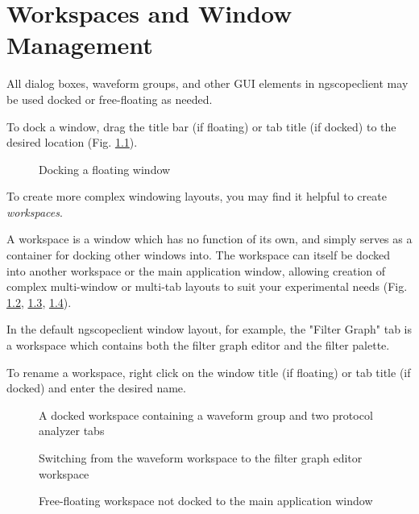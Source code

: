 \chapter{Workspaces and Window Management}

All dialog boxes, waveform groups, and other GUI elements in ngscopeclient may be used docked or free-floating as
needed.

To dock a window, drag the title bar (if floating) or tab title (if docked) to the desired location (Fig.
\ref{w-docking}).

\begin{figure}[h]
\centering
{}
\caption{Docking a floating window}
\label{w-docking}
\end{figure}

To create more complex windowing layouts, you may find it helpful to create \emph{workspaces}.

A workspace is a window which has no function of its own, and simply serves as a container for docking other windows
into. The workspace can itself be docked into another workspace or the main application window, allowing creation of
complex multi-window or multi-tab layouts to suit your experimental needs (Fig. \ref{w-workspace}, \ref{w-workspace2},
\ref{w-workspace3}).

In the default ngscopeclient window layout, for example, the "Filter Graph" tab is a workspace which contains both the
filter graph editor and the filter palette.

To rename a workspace, right click on the window title (if floating) or tab title (if docked) and enter the desired
name.

\begin{figure}[h]
\centering
{}
\caption{A docked workspace containing a waveform group and two protocol analyzer tabs}
\label{w-workspace}
\end{figure}

\begin{figure}[h]
\centering
{}
\caption{Switching from the waveform workspace to the filter graph editor workspace}
\label{w-workspace2}
\end{figure}

\begin{figure}[h]
\centering
{}
\caption{Free-floating workspace not docked to the main application window}
\label{w-workspace3}
\end{figure}
